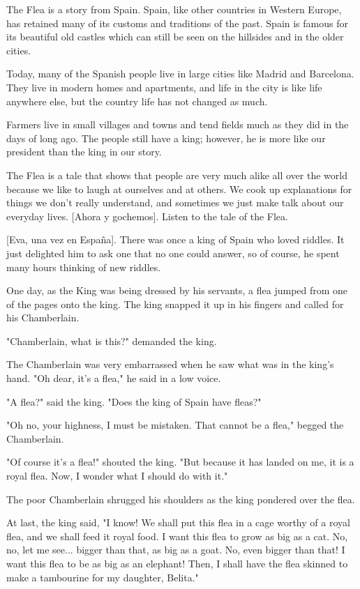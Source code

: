 The Flea is a story from Spain. Spain, like other countries in Western Europe, has retained many of its customs and traditions of the past. Spain is famous for its beautiful old castles which can still be seen on the hillsides and in the older cities.

Today, many of the Spanish people live in large cities like Madrid and Barcelona. They live in modern homes and apartments, and life in the city is like life anywhere else, but the country life has not changed as much.

Farmers live in small villages and towns and tend fields much as they did in the days of long ago. The people still have a king; however, he is more like our president than the king in our story.

The Flea is a tale that shows that people are very much alike all over the world because we like to laugh at ourselves and at others. We cook up explanations for things we don't really understand, and sometimes we just make talk about our everyday lives. [Ahora y gochemos]. Listen to the tale of the Flea.

    [Eva, una vez en España]. There was once a king of Spain who loved riddles. It just delighted him to ask one that no one could answer, so of course, he spent many hours thinking of new riddles.

One day, as the King was being dressed by his servants, a flea jumped from one of the pages onto the king. The king snapped it up in his fingers and called for his Chamberlain.

"Chamberlain, what is this?" demanded the king.

The Chamberlain was very embarrassed when he saw what was in the king's hand. "Oh dear, it's a flea," he said in a low voice.

"A flea?" said the king. "Does the king of Spain have fleas?"

"Oh no, your highness, I must be mistaken. That cannot be a flea," begged the Chamberlain.

"Of course it's a flea!" shouted the king. "But because it has landed on me, it is a royal flea. Now, I wonder what I should do with it."

The poor Chamberlain shrugged his shoulders as the king pondered over the flea.

At last, the king said, "I know! We shall put this flea in a cage worthy of a royal flea, and we shall feed it royal food. I want this flea to grow as big as a cat. No, no, let me see... bigger than that, as big as a goat. No, even bigger than that! I want this flea to be as big as an elephant! Then, I shall have the flea skinned to make a tambourine for my daughter, Belita."

